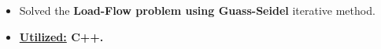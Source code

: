 \documentclass[10pt,a4paper,ragged2e,withhyper]{altacv}
\begin{document}
\begin{paracol}{2}
\begin{itemize}
\item Solved the \textbf{Load-Flow problem using Guass-Seidel} iterative method.
\item \textbf{\underline{Utilized:} C++.}
\end{itemize}
















\end{paracol}
\end{document}
